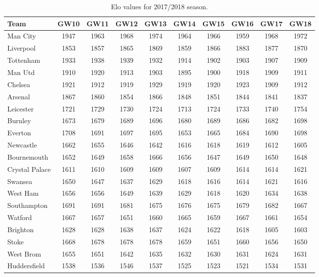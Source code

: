 \begin{table}[H]
\centering
\smaller
\begin{tabular}{|l|c|c|c|c|c|c|c|c|c|}
\hline
Team           & GW10 & GW11 & GW12 & GW13 & GW14 & GW15 & GW16 & GW17 & GW18 \\
\hline
Man City       & 1947 & 1963 & 1968 & 1974 & 1964 & 1966 & 1959 & 1968 & 1972 \\
Liverpool      & 1853 & 1857 & 1865 & 1869 & 1859 & 1866 & 1883 & 1877 & 1870 \\
Tottenham      & 1933 & 1938 & 1939 & 1932 & 1914 & 1902 & 1903 & 1907 & 1909 \\
Man Utd        & 1910 & 1920 & 1913 & 1903 & 1895 & 1900 & 1918 & 1909 & 1911 \\
Chelsea        & 1921 & 1912 & 1919 & 1929 & 1919 & 1920 & 1923 & 1909 & 1912 \\
Arsenal        & 1867 & 1860 & 1854 & 1866 & 1848 & 1851 & 1844 & 1841 & 1837 \\
Leicester      & 1721 & 1729 & 1730 & 1724 & 1713 & 1724 & 1733 & 1740 & 1754 \\
Burnley        & 1673 & 1679 & 1689 & 1696 & 1680 & 1689 & 1686 & 1682 & 1698 \\
Everton        & 1708 & 1691 & 1697 & 1695 & 1653 & 1665 & 1684 & 1690 & 1698 \\
Newcastle      & 1662 & 1655 & 1646 & 1642 & 1616 & 1618 & 1619 & 1612 & 1605 \\
Bournemouth    & 1652 & 1649 & 1658 & 1666 & 1656 & 1647 & 1649 & 1650 & 1648 \\
Crystal Palace & 1611 & 1610 & 1609 & 1609 & 1607 & 1609 & 1614 & 1614 & 1621 \\
Swansea        & 1650 & 1647 & 1637 & 1629 & 1618 & 1616 & 1614 & 1621 & 1616 \\
West Ham       & 1656 & 1656 & 1649 & 1639 & 1629 & 1618 & 1620 & 1634 & 1638 \\
Southampton    & 1691 & 1691 & 1681 & 1675 & 1676 & 1675 & 1679 & 1682 & 1667 \\
Watford        & 1667 & 1657 & 1651 & 1660 & 1665 & 1659 & 1667 & 1661 & 1654 \\
Brighton       & 1628 & 1628 & 1638 & 1637 & 1624 & 1622 & 1618 & 1605 & 1603 \\
Stoke          & 1668 & 1678 & 1678 & 1678 & 1659 & 1651 & 1660 & 1656 & 1650 \\
West Brom      & 1655 & 1651 & 1642 & 1635 & 1632 & 1630 & 1631 & 1624 & 1631 \\
Huddersfield   & 1538 & 1536 & 1546 & 1537 & 1525 & 1523 & 1521 & 1534 & 1531 \\
\hline
\end{tabular}
\caption{Elo values for 2017/2018 season.}
\label{tab:elo_values_gameweeks_2}
\end{table}


